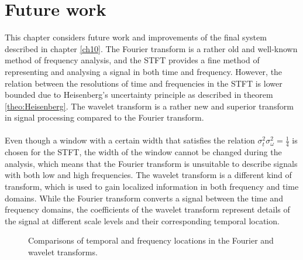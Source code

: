 \chapter{Future work} \label{ch14}
This chapter considers future work and improvements of the final system described in chapter \ref{ch10}. The Fourier transform is a rather old and well-known method of frequency analysis, and the STFT provides a fine method of representing and analysing a signal in both time and frequency. However, the relation between the resolutions of time and frequencies in the STFT is lower bounded due to Heisenberg's uncertainty principle as described in theorem \ref{theo:Heisenberg}. The wavelet transform is a rather new and superior transform in signal processing compared to the Fourier transform.
\\ \\
Even though a window with a certain width that satisfies the relation $\sigma_t^2 \sigma_\omega^2 = \frac{1}{4}$ is chosen for the STFT, the width of the window cannot be changed during the analysis, which means that the Fourier transform is unsuitable to describe signals with both low and high frequencies. The wavelet transform is a different kind of transform, which is used to gain localized information in both frequency and time domains. While the Fourier transform converts a signal between the time and frequency domains, the coefficients of the wavelet transform represent details of the signal at different scale levels and their corresponding temporal location.
\begin{figure}[H]
\hspace*{-0.7cm}
\centering
{}
\caption{Comparisons of temporal and frequency locations in the Fourier and wavelet transforms.}
\label{fig:wave}
\end{figure}

